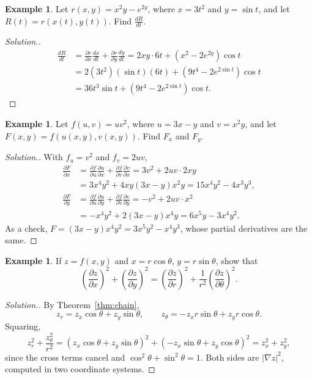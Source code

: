 \documentclass[11pt,a4paper]{article}
\theoremstyle{definition}
\newtheorem{exa}[thm]{Example}
\newenvironment{solution}
  {\renewcommand{\qedsymbol}{}\begin{proof}[\textit{Solution}.]}
  {\end{proof}}
\begin{document}
\begin{exa}
\label{ex:chain2}
Let $r(x,y) =x^2y - e^{2y}$, where $x = 3t^2$ and $y = \sin t$, and let
$R(t) = r(x(t),y(t))$. Find $\frac{dR}{dt}$.
\end{exa}

\begin{solution}
\begin{align*}
\frac{dR}{dt} & = \frac{\partial r}{\partial x} \frac{dx}{dt} + \frac{\partial
r}{\partial y} \frac{dy}{dt} = 2xy\cdot 6t + (x^2 - 2e^{2y}) \cos t\\
& = 2(3t^2)(\sin t)(6t) + (9t^4 - 2e^{2\sin t}) \cos t\\
& = 36t^3\sin t + ( 9t^4 - 2e^{2\sin t})\cos t .
\end{align*}
\end{solution}

\begin{exa}
\label{ex:chain3}
Let $f(u,v) = uv^2$, where $u = 3x-y$ and $v = x^2y$, and let
$F(x,y) = f(u(x,y), v(x,y))$. Find $F_x$ and $F_y$.
\end{exa}

\begin{solution}
With $f_u = v^2$ and $f_v = 2uv$,
\begin{align*}
\frac{\partial F}{\partial x} & = \frac{\partial f}{\partial u} \frac{\partial
u}{\partial x} + \frac{\partial f}{\partial v} \frac{\partial v}{\partial x}
= 3v^2 + 2uv\cdot 2xy\\
& = 3x^4y^2 + 4xy(3x - y)x^2y = 15x^4y^2 - 4x^3y^3,\\[1ex]
\frac{\partial F}{\partial y} & = \frac{\partial f}{\partial u} \frac{\partial
u}{\partial y} +\frac{\partial f}{\partial v} \frac{\partial v}{\partial y}
= -v^2 + 2uv\cdot x^2\\
& = -x^4y^2 + 2(3x -y)x^4y = 6x^5y - 3x^4y^2 .
\end{align*}
As a check, $F = (3x - y)x^4y^2 = 3x^5y^2 - x^4y^3$, whose partial derivatives
are the same.
\end{solution}

\begin{exa}
\label{ex:chainpolar}
If $z = f(x,y)$ and $x = r\cos\theta$, $y = r\sin\theta$, show that
\[\left(\frac{\partial z}{\partial x}\right)^2 + \left(\frac{\partial z}{\partial
y}\right)^2 = \left(\frac{\partial z}{\partial r}\right)^2 +
\frac{1}{r^2}\left(\frac{\partial z}{\partial \theta}\right)^2 .\]
\end{exa}

\begin{solution}
By Theorem~\ref{thm:chain},
\[z_r = z_x\cos\theta + z_y\sin\theta,\qquad z_\theta = -z_x r\sin\theta +
z_yr\cos\theta .\]
Squaring,
\[z_r^2 + \frac{z_\theta^2}{r^2} = (z_x\cos\theta + z_y\sin\theta)^2 + (-z_x
\sin\theta + z_y\cos\theta)^2 = z_x^2 + z_y^2,\]
since the cross terms cancel and $\cos^2\theta + \sin^2\theta = 1$. Both sides
are $|\nabla z|^2$, computed in two coordinate systems.
\end{solution}
\end{document}
